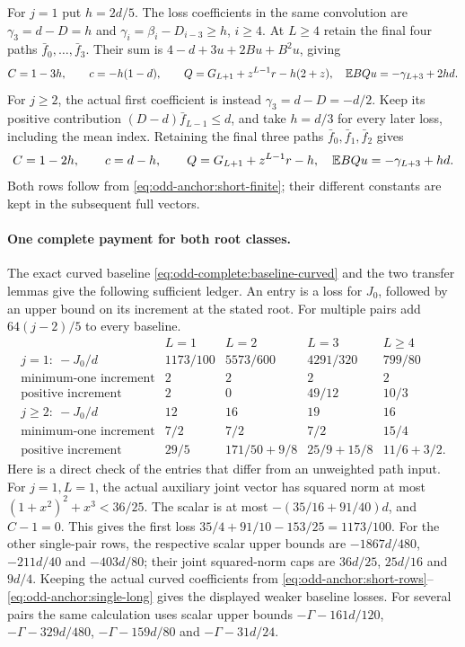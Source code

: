 For $j=1$ put $h=2d/5$. The loss coefficients in the same
convolution are $\gamma_3=d-D=h$ and
$\gamma_i=\beta_i-D_{i-3}\ge h$, $i\ge4$.
At $L\ge4$ retain the final four paths $\bar f_0,\ldots,\bar f_3$.
Their sum is $4-d+3u+2Bu+B^2u$, giving
\begin{equation}\label{eq:odd-anchor:single-long}
 C=1-3h,\qquad c=-h(1-d),\qquad
 Q=G_{L+1}+z^{L-1}r-h(2+z),
 \quad\mathbb E BQu=-\gamma_{L+3}+2hd.
\end{equation}
For $j\ge2$, the actual first coefficient is instead
$\gamma_3=d-D=-d/2$. Keep its positive contribution
$(D-d)\bar f_{L-1}\le d$, and take $h=d/3$ for every later
loss, including the mean index. Retaining the final three paths
$\bar f_0,\bar f_1,\bar f_2$ gives
\begin{equation}\label{eq:odd-anchor:multiple-long}
 C=1-2h,\qquad c=d-h,\qquad
 Q=G_{L+1}+z^{L-1}r-h,
 \quad\mathbb E BQu=-\gamma_{L+3}+hd.
\end{equation}
Both rows follow from \eqref{eq:odd-anchor:short-finite}; their
different constants are kept in the subsequent full vectors.

\paragraph{One complete payment for both root classes.}
The exact curved baseline \eqref{eq:odd-complete:baseline-curved}
and the two transfer lemmas give the following sufficient ledger.
An entry is a loss for $J_0$, followed by an upper bound on its
increment at the stated root. For multiple pairs add
$64(j-2)/5$ to every baseline.
\[
\begin{array}{c|cccc}
 &L=1&L=2&L=3&L\ge4\\\hline
 j=1:\ -J_0/d&1173/100&5573/600&4291/320&799/80\\
 \text{minimum-one increment}&2&2&2&2\\
 \text{positive increment}&2&0&49/12&10/3\\\hline
 j\ge2:\ -J_0/d&12&16&19&16\\
 \text{minimum-one increment}&7/2&7/2&7/2&15/4\\
 \text{positive increment}&29/5&171/50+9/8&25/9+15/8&11/6+3/2.
\end{array}
\]
Here is a direct check of the entries that differ from an
unweighted path input. For $j=1,L=1$, the actual auxiliary joint
vector has squared norm at most
$(1+x^2)^2+x^3<36/25$. The scalar is at most
$-(35/16+91/40)d$, and $C-1=0$. This gives the first loss
$35/4+91/10-153/25=1173/100$.
For the other single-pair rows, the respective scalar upper
bounds are $-1867d/480$, $-211d/40$ and $-403d/80$;
their joint squared-norm caps are $36d/25$, $25d/16$ and
$9d/4$. Keeping the actual curved coefficients from
\eqref{eq:odd-anchor:short-rows}--\eqref{eq:odd-anchor:single-long}
gives the displayed weaker baseline losses. For several pairs
the same calculation uses scalar upper bounds
$-\Gamma-161d/120$, $-\Gamma-329d/480$,
$-\Gamma-159d/80$ and $-\Gamma-31d/24$.

